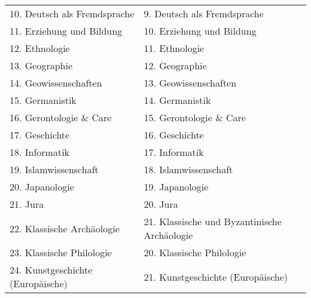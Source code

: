 {\begin{longtable}{|p{7.5cm}|p{7.5cm}|}
        10. Deutsch als Fremdsprache                                     & 9. Deutsch als Fremdsprache                                      \\
        11. Erziehung und Bildung                                        & 10. Erziehung und Bildung                                        \\
        12. Ethnologie                                                   & 11. Ethnologie                                                   \\
        13. Geographie                                                   & 12. Geographie                                                   \\
        14. Geowissenschaften                                            & 13. Geowissenschaften                                            \\
        15. Germanistik                                                  & 14. Germanistik                                                  \\
        16. Gerontologie \& Care                                         & 15. Gerontologie \& Care                                         \\
        17. Geschichte                                                   & 16. Geschichte                                                   \\
        18. Informatik                                                   & 17. Informatik                                                   \\
        19. Islamwissenschaft                                            & 18. Islamwissenschaft                                            \\
        20. Japanologie                                                  & 19. Japanologie                                                  \\
        21. Jura                                                         & 20. Jura                                                         \\
        22. Klassische Archäologie                                       & 21. Klassische und Byzantinische Archäologie                     \\
        23. Klassische Philologie                                        & 20. Klassische Philologie                                        \\
        24. Kunstgeschichte (Europäische)                                & 21. Kunstgeschichte (Europäische)                                \\

\end{longtable}}
